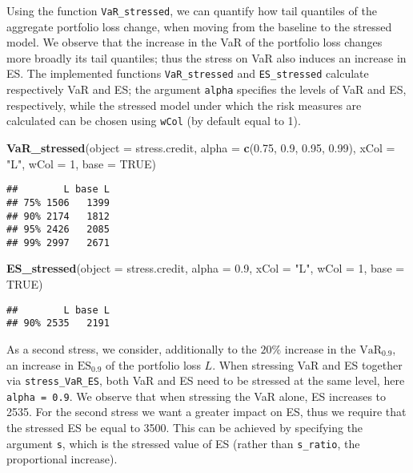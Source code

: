 \documentclass[
]{article}
\newenvironment{Shaded}{\begin{snugshade}}{\end{snugshade}}
\newcommand{\DataTypeTok}[1]{\textcolor[rgb]{0.13,0.29,0.53}{#1}}
\newcommand{\DecValTok}[1]{\textcolor[rgb]{0.00,0.00,0.81}{#1}}
\newcommand{\FloatTok}[1]{\textcolor[rgb]{0.00,0.00,0.81}{#1}}
\newcommand{\KeywordTok}[1]{\textcolor[rgb]{0.13,0.29,0.53}{\textbf{#1}}}
\newcommand{\NormalTok}[1]{#1}
\newcommand{\OtherTok}[1]{\textcolor[rgb]{0.56,0.35,0.01}{#1}}
\newcommand{\StringTok}[1]{\textcolor[rgb]{0.31,0.60,0.02}{#1}}
\begin{document}
Using the function \texttt{VaR\_stressed}, we can quantify how tail quantiles of the aggregate portfolio loss change, when moving from the baseline to the stressed model. We observe that the increase in the VaR of the portfolio loss changes more broadly its tail quantiles; thus the stress on VaR also induces an increase in ES. The implemented functions \texttt{VaR\_stressed} and \texttt{ES\_stressed} calculate respectively VaR and ES; the argument \texttt{alpha} specifies the levels of VaR and ES, respectively, while the stressed model under which the risk measures are calculated can be chosen using \texttt{wCol} (by default equal to 1).

\begin{Shaded}
\begin{Highlighting}[]
\KeywordTok{VaR\_stressed}\NormalTok{(}\DataTypeTok{object =}\NormalTok{ stress.credit, }\DataTypeTok{alpha =} \KeywordTok{c}\NormalTok{(}\FloatTok{0.75}\NormalTok{, }\FloatTok{0.9}\NormalTok{, }\FloatTok{0.95}\NormalTok{, }\FloatTok{0.99}\NormalTok{), }
    \DataTypeTok{xCol =} \StringTok{"L"}\NormalTok{, }\DataTypeTok{wCol =} \DecValTok{1}\NormalTok{, }\DataTypeTok{base =} \OtherTok{TRUE}\NormalTok{)}
\end{Highlighting}
\end{Shaded}

\begin{verbatim}
##        L base L
## 75% 1506   1399
## 90% 2174   1812
## 95% 2426   2085
## 99% 2997   2671
\end{verbatim}

\begin{Shaded}
\begin{Highlighting}[]
\KeywordTok{ES\_stressed}\NormalTok{(}\DataTypeTok{object =}\NormalTok{ stress.credit, }\DataTypeTok{alpha =} \FloatTok{0.9}\NormalTok{, }\DataTypeTok{xCol =} \StringTok{"L"}\NormalTok{, }\DataTypeTok{wCol =} \DecValTok{1}\NormalTok{, }
    \DataTypeTok{base =} \OtherTok{TRUE}\NormalTok{)}
\end{Highlighting}
\end{Shaded}

\begin{verbatim}
##        L base L
## 90% 2535   2191
\end{verbatim}

As a second stress, we consider, additionally to the \(20\%\) increase in the \(\text{VaR}_{0.9}\), an increase in \(\text{ES}_{0.9}\) of the portfolio loss \(L\). When stressing VaR and ES together via \texttt{stress\_VaR\_ES}, both VaR and ES need to be stressed at the same level, here \texttt{alpha\ =\ 0.9}. We observe that when stressing the VaR alone, ES increases to 2535. For the second stress we want a greater impact on ES, thus we require that the stressed ES be equal to 3500. This can be achieved by specifying the argument \texttt{s}, which is the stressed value of ES (rather than \texttt{s\_ratio}, the proportional increase).
\end{document}
